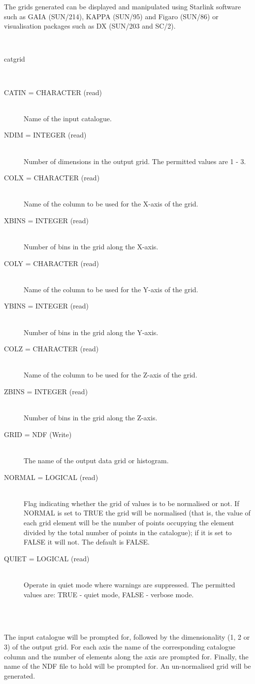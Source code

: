 \documentclass[twoside,11pt]{article}
\renewcommand{\_}{\texttt{\symbol{95}}}
\newlength{\sstexampleslength}
\newcommand{\sstusage}[1]{\item[Usage:] \mbox{}
\\[1.3ex]{\raggedright \ssttt #1}}
\newcommand{\sstparameters}[1]{
   \item[Parameters:] \mbox{} \\
   \vspace{-3.5ex}
   \begin{description}
      #1
   \end{description}
}
\newcommand{\sstexamples}[1]{
   \item[Examples:] \mbox{} \\
   \vspace{-3.5ex}
   \begin{description}
      #1
   \end{description}
}
\newcommand{\sstsubsection}[1]{ \item[{#1}] \mbox{} \\}
\newcommand{\sstexamplesubsection}[2]{\sloppy
\item[\parbox{\sstexampleslength}{\ssttt #1}] \mbox{} \vspace{1.0ex}
\\ #2 }
\newcommand{\sstusage}[1]{\item[Usage:]
      \begin{description}
         {\ssttt #1}
      \end{description}
      \\
   }
\newcommand{\sstparameters}[1]{
      \item[Parameters:] \\
      \begin{description}
         #1
      \end{description}
      \\
   }
\newcommand{\sstexamples}[1]{
      \item[Examples:] \\
      \begin{description}
         #1
      \end{description}
      \\
   }
\newcommand{\sstsubsection}[1]{\item[{#1}]}
\newcommand{\sstexamplesubsection}[2]{\item[{\ssttt #1}] #2}
\begin{document}
\begin{htmlonly}
{{      The grids generated can be displayed and manipulated using Starlink
      software such as GAIA (SUN/214), KAPPA (SUN/95) and Figaro (SUN/86)
      or visualisation packages such as DX (SUN/203 and SC/2).
   }
   \sstusage{
      catgrid
   }
   \sstparameters{
      \sstsubsection{
         CATIN  =  CHARACTER (read)
      }{
         Name of the input catalogue.
      }
      \sstsubsection{
         NDIM  =  INTEGER (read)
      }{
         Number of dimensions in the output grid.  The permitted values
         are 1 - 3.
      }
      \sstsubsection{
         COLX  =  CHARACTER (read)
      }{
         Name of the column to be used for the X-axis of the grid.
      }
      \sstsubsection{
         XBINS  =  INTEGER (read)
      }{
         Number of bins in the grid along the X-axis.
      }
      \sstsubsection{
         COLY  =  CHARACTER (read)
      }{
         Name of the column to be used for the Y-axis of the grid.
      }
      \sstsubsection{
         YBINS  =  INTEGER (read)
      }{
         Number of bins in the grid along the Y-axis.
      }
      \sstsubsection{
         COLZ  =  CHARACTER (read)
      }{
         Name of the column to be used for the Z-axis of the grid.
      }
      \sstsubsection{
         ZBINS  =  INTEGER (read)
      }{
         Number of bins in the grid along the Z-axis.
      }
      \sstsubsection{
         GRID  =  NDF (Write)
      }{
         The name of the output data grid or histogram.
      }
      \sstsubsection{
         NORMAL  =  LOGICAL (read)
      }{
         Flag indicating whether the grid of values is to be normalised
         or not.  If NORMAL is set to TRUE the grid will be normalised
         (that is, the value of each grid element will be the number of
         points occupying the element divided by the total number of
         points in the catalogue); if it is set to FALSE it will not.
         The default is FALSE.
      }
      \sstsubsection{
         QUIET  =  LOGICAL (read)
      }{
         Operate in quiet mode where warnings are suppressed.  The
         permitted values are:
         TRUE  - quiet mode,
         FALSE - verbose mode.
      }
   }
   \sstexamples{
      \sstexamplesubsection{
         catgrid
      }{
         The input catalogue will be prompted for, followed by the
         dimensionality (1, 2 or 3) of the output grid.  For each axis
         the name of the corresponding catalogue column and the number of
         elements along the axis are prompted for.  Finally, the name of
         the NDF file to hold will be prompted for.  An un-normalised
         grid will be generated.
}}}
\end{htmlonly}
\end{document}
